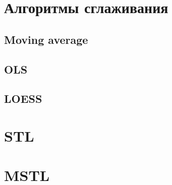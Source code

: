 \documentclass[12pt,fleqn]{article}
\begin{document}
	\section{Алгоритмы сглаживания}
	
	\subsection{Moving average}
	
	\subsection{OLS}
	
	\subsection{LOESS}
	
	\section{STL}
	
	\section{MSTL}
\end{document}
